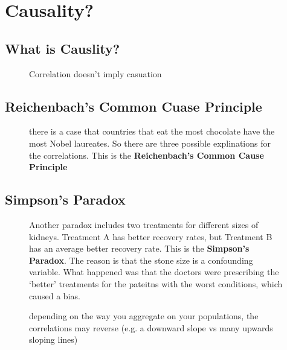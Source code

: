 \documentclass[11pt]{article}
\begin{document}


\tableofcontents

\clearpage

\section{Causality?}

\subsection{What is Causlity?}

\begin{figure}[H]
    \centering
    \caption{Correlation doesn't imply casuation}
\end{figure}

\subsection{Reichenbach's Common Cuase Principle}

\begin{figure}[H]
    \centering
    \caption{there is a case that countries that eat the most chocolate have the most Nobel laureates. So there are three possible explinations for the correlations. This is the \textbf{Reichenbach's Common Cause Principle}}
\end{figure}

\subsection{Simpson's Paradox}

\begin{figure}[H]
    \centering
    \caption{Another paradox includes two treatments for different sizes of kidneys. Treatment A has better recovery rates, but Treatment B has an average better recovery rate. This is the \textbf{Simpson's Paradox}. The reason is that the stone size is a confounding variable. What happened was that the doctors were prescribing the `better' treatments for the pateitns with the worst conditions, which caused a bias.}
\end{figure}

\begin{figure}[H]
    \centering
    \caption{depending on the way you aggregate on your populations, the correlations may reverse (e.g. a downward slope vs many upwards sloping lines)}
\end{figure}
\end{document}
